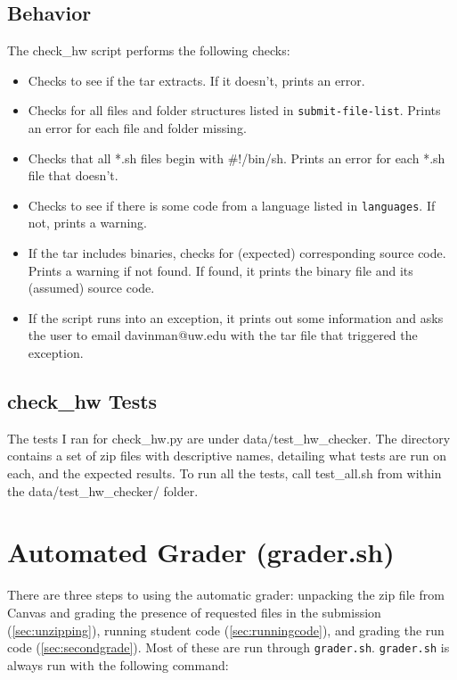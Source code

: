 \documentclass[12pt]{article}
\begin{document}
\subsection{Behavior}

The check\_hw script performs the following checks:

\begin{itemize}
\item Checks to see if the tar extracts. If it doesn't, prints an error.
\item Checks for all files and folder structures listed in \texttt{submit-file-list}. Prints an error for each file and folder missing.
\item Checks that all *.sh files begin with \#!/bin/sh. Prints an error for each *.sh file that doesn't.
\item Checks to see if there is some code from a language listed in \texttt{languages}. If not, prints a warning.
\item If the tar includes binaries, checks for (expected) corresponding source code. Prints a warning if not found. If found, it prints the binary file and its (assumed) source code.
\item If the script runs into an exception, it prints out some information and asks the user to email davinman@uw.edu with the tar file that triggered the exception.
\end{itemize}

\subsection{check\_hw Tests}

The tests I ran for check\_hw.py are under data/test\_hw\_checker. The directory contains a set of zip files with descriptive names, detailing what tests are run on each, and the expected results. To run all the tests, call test\_all.sh from within the data/test\_hw\_checker/ folder.

\section{Automated Grader (grader.sh)} \label{sec:autograder}

There are three steps to using the automatic grader: unpacking the zip file from Canvas and grading the presence of requested files in the submission (\ref{sec:unzipping}), running student code (\ref{sec:runningcode}), and grading the run code (\ref{sec:secondgrade}). Most of these are run through \texttt{grader.sh}. \texttt{grader.sh} is always run with the following command:
\end{document}
